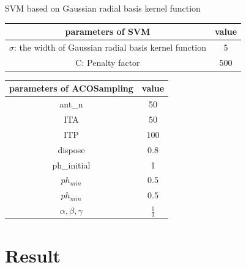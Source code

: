 \documentclass[10pt]{beamer}
\begin{document}
\begin{frame}{SVM based on Gaussian radial basis kernel function}

	\begin{table}[hb]
    \centering
    \begin{tabular}{c|c}
        \hline 
        parameters of SVM	&value\\
        \hline 
        $\sigma$: the width of Gaussian radial basis kernel function		&5\\
        \hline 
        C: Penalty factor	&500\\
        \hline
    \end{tabular}
    \label{SVM}
\end{table}

\begin{table}[hb]
    \centering
    \begin{tabular}{c|c}
        \hline 
        parameters of ACOSampling	&value\\
        \hline 
        ant\_n		&50\\
        \hline 
        ITA		&50\\
        \hline
                ITP		&100\\
        \hline 
        dispose		&0.8\\
        \hline
        ph\_initial		&1\\
        \hline 
        $ph_{min}$		&0.5\\
        \hline
        $ph_{min}$		&0.5\\
        \hline
        $\alpha, \beta, \gamma$	&$\frac{1}{3}$\\
        \hline
    \end{tabular}
    \label{aco}
\end{table}

\end{frame}

\section{Result}
\end{document}
